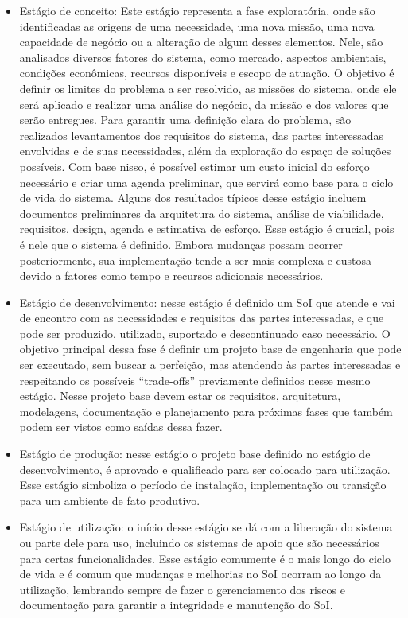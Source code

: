 	\begin{itemize}
		\item Estágio de conceito: Este estágio representa a fase exploratória, onde são identificadas as origens de uma necessidade, uma nova missão, uma nova capacidade de negócio ou a alteração de algum desses elementos. Nele, são analisados diversos fatores do sistema, como mercado, aspectos ambientais, condições econômicas, recursos disponíveis e escopo de atuação. O objetivo é definir os limites do problema a ser resolvido, as missões do sistema, onde ele será aplicado e realizar uma análise do negócio, da missão e dos valores que serão entregues. Para garantir uma definição clara do problema, são realizados levantamentos dos requisitos do sistema, das partes interessadas envolvidas e de suas necessidades, além da exploração do espaço de soluções possíveis. Com base nisso, é possível estimar um custo inicial do esforço necessário e criar uma agenda preliminar, que servirá como base para o ciclo de vida do sistema. Alguns dos resultados típicos desse estágio incluem documentos preliminares da arquitetura do sistema, análise de viabilidade, requisitos, design, agenda e estimativa de esforço. Esse estágio é crucial, pois é nele que o sistema é definido. Embora mudanças possam ocorrer posteriormente, sua implementação tende a ser mais complexa e custosa devido a fatores como tempo e recursos adicionais necessários.
		\item Estágio de desenvolvimento: nesse estágio é definido um SoI que atende e vai de encontro com as necessidades e requisitos das partes interessadas, e que pode ser produzido, utilizado, suportado e descontinuado caso necessário. O objetivo principal dessa fase é definir um projeto base de engenharia que pode ser executado, sem buscar a perfeição, mas atendendo às partes interessadas e respeitando os possíveis ``trade-offs'' previamente definidos nesse mesmo estágio. Nesse projeto base devem estar os requisitos, arquitetura, modelagens, documentação e planejamento para próximas fases que também podem ser vistos como saídas dessa fazer.
		\item Estágio de produção: nesse estágio o projeto base definido no estágio de desenvolvimento, é aprovado e qualificado para ser colocado para utilização. Esse estágio simboliza o período de instalação, implementação ou transição para um ambiente de fato produtivo.
		\item Estágio de utilização: o início desse estágio se dá com a liberação do sistema ou parte dele para uso, incluindo os sistemas de apoio que são necessários para certas funcionalidades. Esse estágio comumente é o mais longo do ciclo de vida e é comum que mudanças e melhorias no SoI ocorram ao longo da utilização, lembrando sempre de fazer o gerenciamento dos riscos e documentação para garantir a integridade e manutenção do SoI.

\end{itemize}
